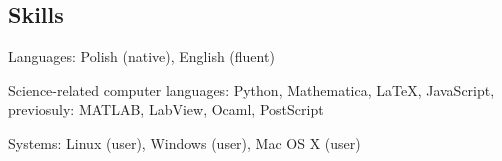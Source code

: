 \documentclass[margin,line]{resume}
\begin{document}
\begin{resume}
\newpage

    \section{\mysidestyle Skills}
    \begin{list2}
        \item Languages: Polish (native), English (fluent)
        \item Science-related computer languages: Python, Mathematica, LaTeX, JavaScript, previosuly: MATLAB, LabView, Ocaml, PostScript
        \item Systems: Linux (user), Windows (user), Mac OS X (user)
    \end{list2}


\end{resume}
\end{document}
